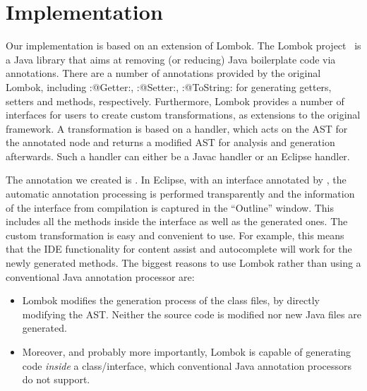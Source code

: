 \section{Implementation}

Our implementation is based on an extension of Lombok. The Lombok
project~\cite{lombok} is a Java library that aims at removing (or
reducing) Java boilerplate code via
annotations. There are a number of annotations provided by the
original Lombok, including \Q:@Getter:, \Q:@Setter:,
\Q:@ToString: for generating getters, setters and 
methods, respectively.  Furthermore, Lombok provides a number of
interfaces for users to create custom transformations, as extensions
to the original framework.
A transformation is based on a handler, which acts on the AST for the
annotated node and returns a modified AST for analysis and
generation afterwards. Such a handler can either be a Javac handler or
an Eclipse handler.

The annotation we created is \mixin. In Eclipse, with an interface annotated by
\mixin, the automatic annotation processing is performed transparently and the information of
the interface from compilation is captured in the ``Outline'' window. This includes
all the methods inside the interface as well as the generated ones.  The custom
transformation is easy and convenient to use.  For example, this means that the
IDE functionality for content assist and autocomplete will work for the newly generated
methods. The biggest reasons to use Lombok rather than using a conventional Java
 annotation processor are:
\begin{itemize}
\item Lombok modifies the generation process of the class files, by directly modifying the AST.
Neither the source code is modified nor new Java files are generated.
\item Moreover, and probably more importantly, Lombok is capable of generating
  code \emph{inside} a class/interface, which conventional
  Java annotation processors do not support.
\end{itemize}

